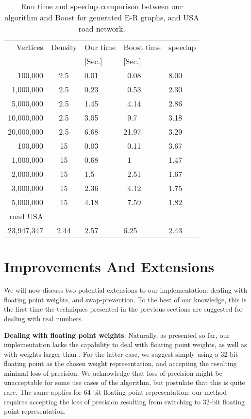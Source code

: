 \documentclass[conference,10pt,twocolumn]{IEEEtran}
\begin{document}
\begin{table}
\begin{tabular}{| r | c | l | l |l|}
\hline
Vertices & Density & Our time & Boost time & speedup \\ 
    &   &   [Sec.] & [Sec.] & \\ \hline\hline
100,000 & 2.5 & 0.01 & ~0.08 & 8.00 \\ \hline
1,000,000 & 2.5 & 0.23 & ~0.53 & 2.30 \\ \hline
5,000,000 & 2.5 & 1.45 & ~4.14 & 2.86 \\ \hline
10,000,000 & 2.5 & 3.05 & ~9.7 & 3.18 \\ \hline
20,000,000 & 2.5 & 6.68 & 21.97 & 3.29 \\ \hline\hline
100,000 & 15 & 0.03 & ~0.11 & 3.67 \\ \hline
1,000,000 & 15 & 0.68 & ~1 & 1.47 \\ \hline
2,000,000 & 15 & 1.5 & ~2.51 & 1.67 \\ \hline
3,000,000 & 15 & 2.36 & ~4.12 & 1.75 \\ \hline
5,000,000 & 15 & 4.18 & ~7.59 & 1.82\\ \hline\hline
road USA & & &  & \\
23,947,347 & 2.44 & 2.57 & 6.25 & 2.43\\ \hline   \end{tabular}
\caption{Run time and speedup comparison between our algorithm and Boost for generated E-R graphs, and USA road network. }
\label{tab:time}
\end{table}

\section{Improvements And Extensions}  \label{sec:extn}
We will now discuss two potential extensions to our implementation: dealing with floating point weights, and swap-prevention.  To the best of our knowledge, this is the first time the techniques presented in the previous sections are suggested for dealing with real numbers.

{\bf Dealing with floating point weights}: Naturally, as presented so far, our implementation lacks the capability to deal with floating point weights, as well as with weights larger than . For the latter case, we suggest simply using a 32-bit floating point as the chosen weight representation, and accepting the resulting minimal loss of precision. We acknowledge that loss of precision might be unacceptable for some use cases of the algorithm, but postulate that this is quite rare. The same applies for 64-bit floating point representation: our method requires accepting the loss of precision resulting from switching to 32-bit floating point representation.
\end{document}
